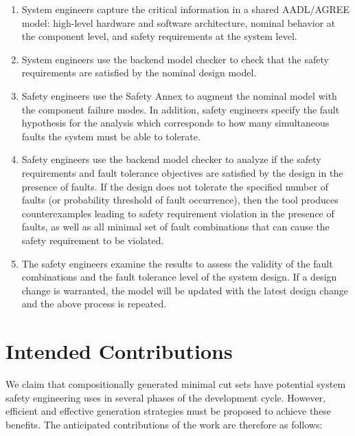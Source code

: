 \begin{enumerate}
	\item System engineers capture the critical information in a shared AADL/AGREE model:  high-level hardware and software architecture, nominal behavior at the component level, and safety requirements at the system level.%
	\item System engineers use the backend model checker to check that the safety requirements are satisfied by the nominal design model. 
	\item Safety engineers use the Safety Annex to augment the nominal model with the component failure modes. %
	In addition, safety engineers specify the fault hypothesis for the analysis which corresponds to how many simultaneous faults the system must be able to tolerate.
	\item Safety engineers use the backend model checker to analyze if the safety requirements and fault tolerance objectives are satisfied by the design in the presence of faults. %
	If the design does not tolerate the specified number of faults (or probability threshold of fault occurrence), then the tool produces counterexamples leading to safety requirement violation in the presence of faults, %
	 as well as all minimal set of fault combinations that can cause the safety requirement to be violated.
	\item The safety engineers examine the results to assess the validity of the fault combinations and the fault tolerance level of the system design. If a design change is warranted, the model will be updated with the latest design change and the above process is repeated.
\end{enumerate}

\section{Intended Contributions}
We claim that compositionally generated minimal cut sets have potential system safety engineering uses in several phases of the development cycle. However, efficient and effective generation strategies must be proposed to achieve these benefits. The anticipated contributions of the work are therefore as follows:

